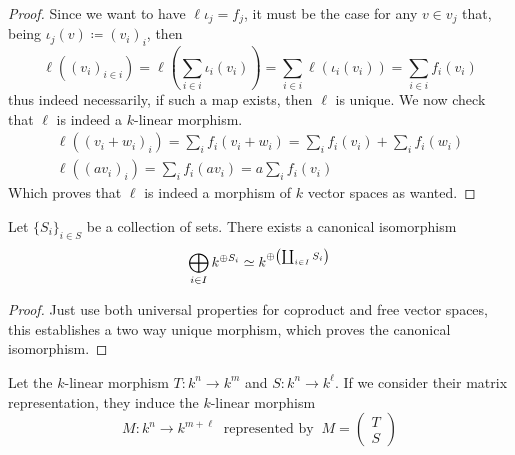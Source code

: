 \begin{proof}
    Since we want to have \(\ell  \iota_j = f_j\), it must be the case for
    any \(v \in v_j\) that, being \(\iota_j(v) \coloneq (v_i)_i\), then
    \[
        \ell((v_i)_{i \in i}) = \ell \left( \sum_{i \in i} \iota_i(v_i) \right) =
        \sum_{i \in i} \ell(\iota_i(v_i)) = \sum_{i \in i} f_i(v_i)
    \]
    thus indeed necessarily, if such a map exists, then \(\ell\) is unique. We
    now check that \(\ell\) is indeed a \(k\)-linear morphism.
    \begin{gather*}
        \ell\left( (v_i + w_i)_i \right) = \sum_i f_i(v_i + w_i) = \sum_i f_i(v_i)
        + \sum_i  f_i(w_i) \\
        \ell((av_i)_i) = \sum_i f_i(av_i) = a \sum_i f_i(v_i)
    \end{gather*}
    Which proves that \(\ell\) is indeed a morphism of \(k\) vector spaces as
    wanted.
\end{proof}

\begin{proposition}
    Let \(\{S_i\}_{i \in S}\) be a collection of sets. There exists a canonical
    isomorphism
    \[
        \bigoplus_{i \in I} k^{\oplus S_i} \simeq k^{\oplus \left( \coprod_{i \in I}
                S_i \right)}
    \]
\end{proposition}

\begin{proof}
    Just use both universal properties for coproduct and free vector spaces, this
    establishes a two way unique morphism, which proves the canonical
    isomorphism.
\end{proof}

\begin{proposition}
    Let the \(k\)-linear morphism \(T : k^n \to k^m\) and \(S:k^n \to k^\ell\).
    If we consider their matrix representation, they induce the \(k\)-linear
    morphism
    \[
        M : k^n \to k^{m+\ell}\ \text{ represented by }\
        M = \begin{pmatrix} T \\ S \end{pmatrix}
    \]
\end{proposition}

